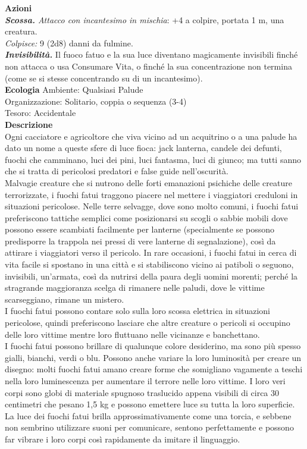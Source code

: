 \begin{multicols}{2}
\smallskip\textbf{Azioni}\\
\emph{\textbf{Scossa.} Attacco con incantesimo in mischia}: +4 a colpire, portata 1 m, una creatura.\\
\emph{Colpisce:} 9 (2d8) danni da fulmine.\\
\emph{\textbf{Invisibilità.}} Il fuoco fatuo e la sua luce diventano magicamente invisibili finché non attacca o usa Consumare Vita, o finché la sua concentrazione non termina (come se si stesse concentrando su di un incantesimo).\\
\textbf{Ecologia}
Ambiente: Qualsiasi Palude\\
Organizzazione: Solitario, coppia o sequenza (3-4)\\
Tesoro: Accidentale\\
\textbf{Descrizione}\\
Ogni cacciatore e agricoltore che viva vicino ad un acquitrino o a una palude ha dato un nome a queste sfere di luce fioca: jack lanterna, candele dei defunti, fuochi che camminano, luci dei pini, luci fantasma, luci di giunco; ma tutti sanno che si tratta di pericolosi predatori e false guide nell’oscurità.\\

Malvagie creature che si nutrono delle forti emanazioni psichiche delle creature terrorizzate, i fuochi fatui traggono piacere nel mettere i viaggiatori creduloni in situazioni pericolose. Nelle terre selvagge, dove sono molto comuni, i fuochi fatui preferiscono tattiche semplici come posizionarsi su scogli o sabbie mobili dove possono essere scambiati facilmente per lanterne (specialmente se possono predisporre la trappola nei pressi di vere lanterne di segnalazione), così da attirare i viaggiatori verso il pericolo. In rare occasioni, i fuochi fatui in cerca di vita facile si spostano in una città e si stabiliscono vicino ai patiboli o seguono, invisibili, un’armata, così da nutrirsi della paura degli uomini morenti; perché la stragrande maggioranza scelga di rimanere nelle paludi, dove le vittime scarseggiano, rimane un mistero.\\

I fuochi fatui possono contare solo sulla loro scossa elettrica in situazioni pericolose, quindi preferiscono lasciare che altre creature o pericoli si occupino delle loro vittime mentre loro fluttuano nelle vicinanze e banchettano.\\

I fuochi fatui possono brillare di qualunque colore desiderino, ma sono più spesso gialli, bianchi, verdi o blu. Possono anche variare la loro luminosità per creare un disegno: molti fuochi fatui amano creare forme che somigliano vagamente a teschi nella loro luminescenza per aumentare il terrore nelle loro vittime. I loro veri corpi sono globi di materiale spugnoso traslucido appena visibili di circa 30 centimetri che pesano 1,5 kg e possono emettere luce su tutta la loro superficie. La luce dei fuochi fatui brilla approssimativamente come una torcia, e sebbene non sembrino utilizzare suoni per comunicare, sentono perfettamente e possono far vibrare i loro corpi così rapidamente da imitare il linguaggio.\\


\end{multicols}
